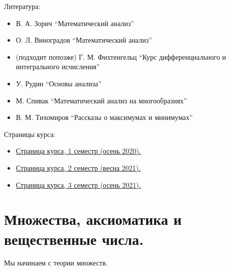 \documentclass[12pt,a4paper]{article}
\date{}
\begin{document}
    \maketitle

    \listoftodos[TODOs]

    \tableofcontents

    \vspace{2em}
    Литература:
    \begin{itemize}
        \item В. А. Зорич ``Математический анализ''
        \item О. Л. Виноградов ``Математический анализ''
        \item (подходит попозже) Г. М. Фихтенгельц ``Курс дифференциального и интегрального исчисления''
        \item У. Рудин ``Основы анализа''
        \item М. Спивак ``Математический анализ на многообразиях''
        \item В. М. Тихомиров ``Рассказы о максимумах и минимумах''
    \end{itemize}

    Страницы курса:
    \begin{itemize}
        \item \href{https://math-cs.spbu.ru/praktika-po-matematicheskomu-analizu-pervyj-semestr-2020/}{Страница курса, 1 семестр (осень 2020).}
        \item \href{https://math-cs.spbu.ru/dmitriystolyarov/analysis_2_spring_2021/}{Страница курса, 2 семестр (весна 2021).}
        \item \href{https://math-cs.spbu.ru/dmitriystolyarov/mathematical-analysis-3-fall-2021/}{Страница курса, 3 семестр (осень 2021).}
    \end{itemize}

    \section{Множества, аксиоматика и вещественные числа.}

    Мы начинаем с теории множеств.
\end{document}
